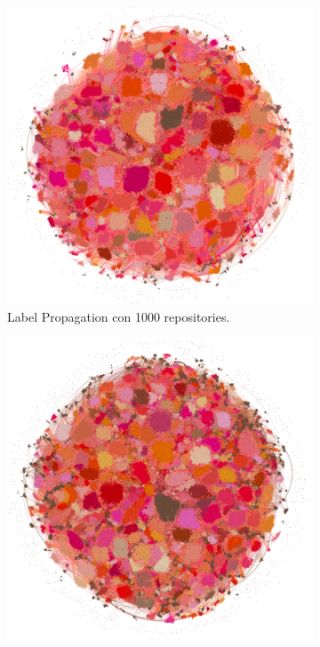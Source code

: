 \documentclass[11pt]{article}
\begin{document}
\begin{itemize}
\begin{figure}[!ht]
\begin{subfigure}{.5\textwidth}
    \end{subfigure}\\[1ex] %
    \begin{subfigure}{.5\textwidth}
        \centering
        \includegraphics[width=\linewidth]{./images/OpenOrdLabelProp_1000.png}
        \caption{Label Propagation con 1000 repositories.}
        \label{fig:LabelPropagation1000}
    \end{subfigure}%
    \begin{subfigure}{.5\textwidth}
        \centering
        \includegraphics[width=\linewidth]{./images/OpenOrdLabelProp_2000.png}

\end{subfigure}
\end{figure}
\end{itemize}
\end{document}
